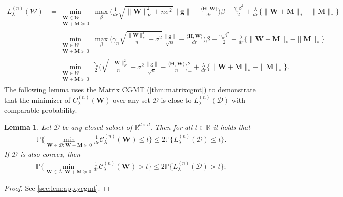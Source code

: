 \documentclass[10pt]{article}
\newcommand{\p}{\mathbb{P}}
\newtheorem{lemma}{Lemma}
\theoremstyle{definition}
\begin{document}
\begin{align}
    L_{\lambda}^{(n)}(\mathcal{W}) &= \min_{\substack{\bm{W} \in \mathcal{W}\\ \bm{W} + \bm{M} \succcurlyeq 0}} \max_{\beta} \bigg( \frac{1}{dr} \sqrt{ \| \bm{W} \|_F^2 + n \sigma^2} \| \bm{g} \| - \frac{\langle{\bm{H}, \bm{W}}\rangle}{dr} \bigg) \beta - \frac{\gamma_n \beta^2}{2} + \frac{\lambda}{dr}\big\{ \| \bm{W} + \bm{M} \|_* - \| \bm{M} \|_* \big\} \\
    &= \min_{\substack{\bm{W} \in \mathcal{W}\\ \bm{W} + \bm{M} \succcurlyeq 0}} \max_{\beta} \bigg( \gamma_n \sqrt{ \frac{\| \bm{W} \|_F^2}{n} +  \sigma^2} \frac{\|\bm{g}\|}{\sqrt{n}} - \frac{\langle{\bm{H}, \bm{W}}\rangle}{dr} \bigg) \beta - \frac{\gamma_n \beta^2}{2} + \frac{\lambda}{dr}\big\{ \| \bm{W} + \bm{M} \|_* - \| \bm{M} \|_* \big\} \\
    &= \min_{\substack{\bm{W} \in \mathcal{W}\\ \bm{W} + \bm{M} \succcurlyeq 0}} \frac{\gamma_n}{2}  \bigg(  \sqrt{\frac{\| \bm{W} \|_F^2}{n} + \sigma^2} \frac{\|\bm{g}\|}{\sqrt{n}} - \frac{\langle \bm{H} , \bm{W} \rangle}{n} \bigg)_+^2 + \frac{\lambda}{dr} \big\{ \| \bm{W} + \bm{M} \|_* - \| \bm{M} \|_* \big\}. \label{MCGMT_objective}
\end{align}
The following lemma uses the Matrix CGMT (\cref{thm:matrixcgmt}) to demonstrate that the minimizer of $C_{\lambda}^{(n)}(\bm{W})$ over any set $\mathcal{D}$ is close to $L_{\lambda}^{(n)}(\mathcal{D})$ with comparable probability.
\begin{lemma} \label{lem:applycgmt}
Let $\mathcal{D}$ be any closed subset of $\mathbb{R}^{d\times d}$.   Then for all $t \in \mathbb{R}$  it holds that
    \begin{align}
      \p\bigg\{ \min_{\bm{W} \in \mathcal{D}: \bm{W+M}  \succcurlyeq 0 } \frac{1}{dr} \mathcal{C}^{(n)}_{\lambda}(\bm{W}) 
         \leq t \bigg\} \leq 2 \p\bigg\{ L^{( n)}_{\lambda}(\mathcal{D})  \leq   t \bigg\}.
    \end{align}
    If $\mathcal{D}$ is also convex, then
    \begin{align}
          \p\bigg\{ \min_{\bm{W} \in \mathcal{D}: \bm{W} + \bm{M} \succcurlyeq 0 } \frac{1}{dr} \mathcal{C}^{(n)}_{\lambda}(\bm{W}) 
         > t \bigg\} \leq 2 \p\bigg\{ L^{( n)}_{\lambda}(\mathcal{D})  >  t \bigg\}; 
    \end{align}
\end{lemma}
\begin{proof}
    See \cref{sec:lem:applycgmt}. 
\end{proof}
\end{document}
